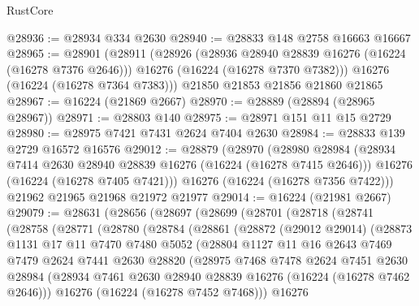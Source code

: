 \begin{lexlean}{RustCore}
\begin{coremodule}
@28936 := @28934 @334 @2630
@28940 := @28833 @148 @2758 @16663 @16667
@28965 := @28901
    (@28911
      (@28926
        (@28936 @28940 @28839 @16276 (@16224 (@16278 @7376 @2646)))
        @16276
        (@16224 (@16278 @7370 @7382)))
      @16276
      (@16224 (@16278 @7364 @7383)))
    @21850
    @21853
    @21856
    @21860
    @21865
@28967 := @16224 (@21869 @2667)
@28970 := @28889 (@28894 (@28965 @28967))
@28971 := @28803 @140
@28975 := @28971 @151 @11 @15 @2729
@28980 := @28975 @7421 @7431 @2624 @7404 @2630
@28984 := @28833 @139 @2729 @16572 @16576
@29012 := @28879
    (@28970
      (@28980
        @28984
        (@28934 @7414 @2630 @28940 @28839 @16276 (@16224 (@16278 @7415 @2646)))
        @16276
        (@16224 (@16278 @7405 @7421)))
      @16276
      (@16224 (@16278 @7356 @7422)))
    @21962
    @21965
    @21968
    @21972
    @21977
@29014 := @16224 (@21981 @2667)
@29079 := @28631
    (@28656
      (@28697
        (@28699
          (@28701
            (@28718
              (@28741
                (@28758
                  (@28771
                    (@28780
                      (@28784
                        (@28861
                          (@28872
                            (@29012 @29014)
                            (@28873
                              @1131
                              @17
                              @11
                              @7470
                              @7480
                              @5052
                              (@28804
                                @1127
                                @11
                                @16
                                @2643
                                @7469
                                @7479
                                @2624
                                @7441
                                @2630
                                @28820
                                (@28975
                                  @7468
                                  @7478
                                  @2624
                                  @7451
                                  @2630
                                  @28984
                                  (@28934
                                    @7461
                                    @2630
                                    @28940
                                    @28839
                                    @16276
                                    (@16224 (@16278 @7462 @2646)))
                                  @16276
                                  (@16224 (@16278 @7452 @7468)))
                                @16276

\end{coremodule}
\end{lexlean}
